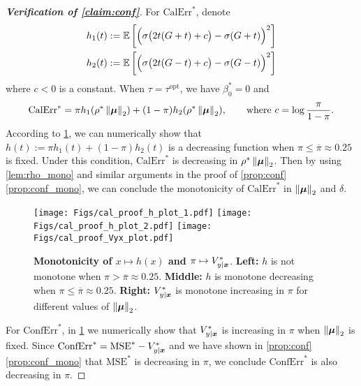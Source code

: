 \begin{proof}[\textbf{Verification of \cref{claim:conf}}]
    For $\mathrm{CalErr}^*$, denote
            \begin{align*}
                h_1(t) & := \mathbb{E}\left[ \Bigl( \sigma\bigl( 2 t (G+t) + c \bigr) - \sigma( G+t ) \Bigr)^2 \right]
                \\
                h_2(t) & := \mathbb{E}\left[ \Bigl( \sigma\bigl( 2 t (G-t) + c \bigr) - \sigma( G-t ) \Bigr)^2 \right]
            \end{align*}
            where $c < 0$ is a constant. When $\tau = \tau^\mathrm{opt}$, we have $\beta_0^* = 0$ and
        \begin{equation*}
            \mathrm{CalErr}^*
            = \pi h_1( \rho^* \left\|{\text{\boldmath $\mu$}}\right\|_2 ) + (1 - \pi) h_2( \rho^* \left\|{\text{\boldmath $\mu$}}\right\|_2 ),
            \qquad \text{where} ~ c = \log\frac{\pi}{1 - \pi}.
    \end{equation*}
    According to \cref{fig:mono_fun}, we can numerically show that $h(t) :=  \pi h_1(t) + (1 - \pi) h_2(t)$ is a decreasing function when $\pi \le \overline{\pi} \approx 0.25$ is fixed. Under this condition, $\mathrm{CalErr}^*$ is decreasing in $\rho^* \left\|{\text{\boldmath $\mu$}}\right\|_2$. Then by using \cref{lem:rho_mono} and similar arguments in the proof of \cref{prop:conf}\ref{prop:conf_mono}, we can conclude the monotonicity of $\mathrm{CalErr}^*$ in $\left\|{\text{\boldmath $\mu$}}\right\|_2$ and $\delta$.

    \begin{figure}[h!]
    \centering
    \texttt{[image: Figs/cal\_proof\_h\_plot\_1.pdf]}
    \texttt{[image: Figs/cal\_proof\_h\_plot\_2.pdf]}
    \texttt{[image: Figs/cal\_proof\_Vyx\_plot.pdf]}
    \caption{
    \textbf{Monotonicity of $x \mapsto h(x)$ and $\pi \mapsto V_{y|\text{\boldmath $x$}}^*$}. \textbf{Left:} $h$ is not monotone when $\pi > \overline{\pi} \approx 0.25$. \textbf{Middle:} $h$ is monotone decreasing when $\pi \le \overline{\pi} \approx 0.25$. \textbf{Right:} $V_{y|\text{\boldmath $x$}}^*$ is monotone increasing in $\pi$ for different values of $\left\|{\text{\boldmath $\mu$}}\right\|_2$.
    }
    \label{fig:mono_fun}
\end{figure}

For $\mathrm{ConfErr}^*$, in \cref{fig:mono_fun} we numerically show that $V_{y|\text{\boldmath $x$}}^*$ is increasing in $\pi$ when $\left\|{\text{\boldmath $\mu$}}\right\|_2$ is fixed. Since $\mathrm{ConfErr}^* = \mathrm{MSE}^* - V_{y|\text{\boldmath $x$}}^*$ and we have shown in \cref{prop:conf}\ref{prop:conf_mono} that $\mathrm{MSE}^*$ is decreasing in $\pi$, we conclude $\mathrm{ConfErr}^*$ is also decreasing in $\pi$.
\end{proof}

